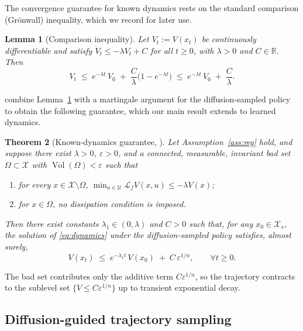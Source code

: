 \documentclass{article}
\newcommand{\R}{\mathbb{R}}
\newcommand{\eps}{\varepsilon}
\newcommand{\Xs}{\mathcal{X}_s}
\newcommand{\Lie}[2]{\mathcal{L}_{#1} #2}
\newcommand{\Vol}{\operatorname{Vol}}
\newtheorem{theorem}{Theorem}
\newtheorem{lemma}[theorem]{Lemma}
\begin{document}
The convergence guarantee for known dynamics rests on the standard comparison
(Gr\"onwall) inequality, which we record for later use.

\begin{lemma}[Comparison inequality]
\label{lem:comparison}
Let $V_t:=V(x_t)$ be continuously differentiable and satisfy
$\dot V_t\le -\lambda V_t + C$ for all $t\ge 0$, with $\lambda>0$ and $C\in\R$.
Then
\[
    V_t \;\le\; e^{-\lambda t}\,V_0 \;+\; \frac{C}{\lambda}\bigl(1-e^{-\lambda t}\bigr)
    \;\le\; e^{-\lambda t}\,V_0 \;+\; \frac{C}{\lambda}.
\]
\end{lemma}

\citet{cheng2026safe} combine Lemma~\ref{lem:comparison} with a martingale
argument for the diffusion-sampled policy to obtain the following guarantee, which
our main result extends to learned dynamics.

\begin{theorem}[Known-dynamics guarantee, \citealp{cheng2026safe}]
\label{thm:known}
Let Assumption~\ref{ass:reg} hold, and suppose there exist $\lambda>0$,
$\eps>0$, and a connected, measurable, invariant bad set $\Omega\subset\mathcal{X}$
with $\Vol(\Omega)<\eps$ such that
\begin{enumerate}[label=\textnormal{(\Alph*)},leftmargin=2.4em]
    \item for every $x\in\mathcal{X}\setminus\Omega$,
    $\displaystyle \min_{u\in\mathcal{U}}\Lie{f}{V}(x,u)\le -\lambda V(x)$;
    \item for $x\in\Omega$, no dissipation condition is imposed.
\end{enumerate}
Then there exist constants $\lambda_1\in(0,\lambda)$ and $C>0$ such that, for any
$x_0\in\Xs$, the solution of \eqref{eq:dynamics} under the diffusion-sampled
policy satisfies, almost surely,
\begin{equation}
\label{eq:known-bound}
    V(x_t)\;\le\; e^{-\lambda_1 t}\,V(x_0) \;+\; C\,\eps^{1/n},
    \qquad \forall t\ge 0.
\end{equation}
\end{theorem}

The bad set contributes only the additive term $C\eps^{1/n}$, so the trajectory
contracts to the sublevel set $\{V\le C\eps^{1/n}\}$ up to transient exponential
decay.

\subsection{Diffusion-guided trajectory sampling}
\end{document}
